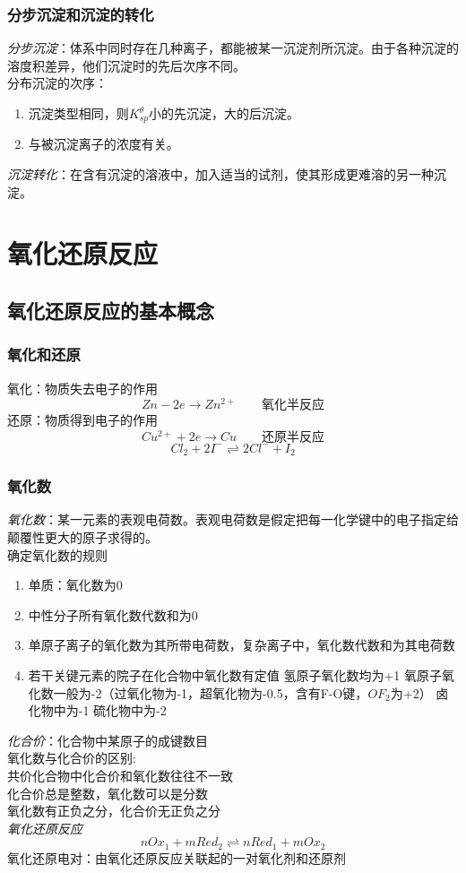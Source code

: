 \documentclass[utf8,a4paper,12pt]{ctexart}
\begin{document}
\subsubsection{分步沉淀和沉淀的转化}
\emph{分步沉淀}：体系中同时存在几种离子，都能被某一沉淀剂所沉淀。由于各种沉淀的溶度积差异，他们沉淀时的先后次序不同。\\
分布沉淀的次序：
\begin{enumerate}[(1)]
\item 沉淀类型相同，则$K_{sp}^{\theta}$小的先沉淀，大的后沉淀。
\item 与被沉淀离子的浓度有关。
\end{enumerate}
\emph{沉淀转化}：在含有沉淀的溶液中，加入适当的试剂，使其形成更难溶的另一种沉淀。
\newpage
\section{氧化还原反应}
\subsection{氧化还原反应的基本概念}
\subsubsection{氧化和还原}
\quad 氧化：物质失去电子的作用
\[
Zn - 2e \rightarrow Zn^{2+}\qquad \text{氧化半反应}
\]
\quad 还原：物质得到电子的作用 
\[
Cu^{2+} + 2e \rightarrow Cu  \qquad \text{还原半反应}
\]
\[
Cl_{2} + 2I^{-} \rightleftharpoons 2Cl^{-} + I_{2}
\]
\subsubsection{氧化数}
\emph{氧化数}：某一元素的表观电荷数。表观电荷数是假定把每一化学键中的电子指定给颠覆性更大的原子求得的。\\
确定氧化数的规则
\begin{enumerate}
\item 单质：氧化数为0
\item 中性分子所有氧化数代数和为0
\item 单原子离子的氧化数为其所带电荷数，复杂离子中，氧化数代数和为其电荷数
\item 若干关键元素的院子在化合物中氧化数有定值
\subitem 氢原子氧化数均为+1
\subitem 氧原子氧化数一般为-2（过氧化物为-1，超氧化物为-0.5，含有F-O键，$OF_{2}$为+2）
\subitem 卤化物中为-1
\subitem 硫化物中为-2
\end{enumerate}
\emph{化合价}：化合物中某原子的成键数目\\
氧化数与化合价的区别:\\
共价化合物中化合价和氧化数往往不一致\\
化合价总是整数，氧化数可以是分数\\
氧化数有正负之分，化合价无正负之分\\
\emph{氧化还原反应}
\[
nOx_{1} + mRed_{2} \rightleftharpoons nRed_{1} + mOx_{2}
\]
氧化还原电对：由氧化还原反应关联起的一对氧化剂和还原剂\\
\end{document}
